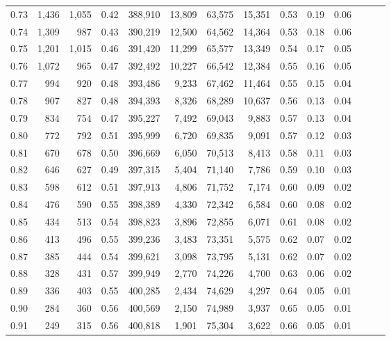 \begin{tabular}{rrrrrrrrrrrrrr}
0.73 &  1,436 &  1,055 &  0.42 &  388,910 &   13,809 &  63,575 &  15,351 &  0.53 &  0.19 &      0.06 \\
0.74 &  1,309 &    987 &  0.43 &  390,219 &   12,500 &  64,562 &  14,364 &  0.53 &  0.18 &      0.06 \\
0.75 &  1,201 &  1,015 &  0.46 &  391,420 &   11,299 &  65,577 &  13,349 &  0.54 &  0.17 &      0.05 \\
0.76 &  1,072 &    965 &  0.47 &  392,492 &   10,227 &  66,542 &  12,384 &  0.55 &  0.16 &      0.05 \\
0.77 &    994 &    920 &  0.48 &  393,486 &    9,233 &  67,462 &  11,464 &  0.55 &  0.15 &      0.04 \\
0.78 &    907 &    827 &  0.48 &  394,393 &    8,326 &  68,289 &  10,637 &  0.56 &  0.13 &      0.04 \\
0.79 &    834 &    754 &  0.47 &  395,227 &    7,492 &  69,043 &   9,883 &  0.57 &  0.13 &      0.04 \\
0.80 &    772 &    792 &  0.51 &  395,999 &    6,720 &  69,835 &   9,091 &  0.57 &  0.12 &      0.03 \\
0.81 &    670 &    678 &  0.50 &  396,669 &    6,050 &  70,513 &   8,413 &  0.58 &  0.11 &      0.03 \\
0.82 &    646 &    627 &  0.49 &  397,315 &    5,404 &  71,140 &   7,786 &  0.59 &  0.10 &      0.03 \\
0.83 &    598 &    612 &  0.51 &  397,913 &    4,806 &  71,752 &   7,174 &  0.60 &  0.09 &      0.02 \\
0.84 &    476 &    590 &  0.55 &  398,389 &    4,330 &  72,342 &   6,584 &  0.60 &  0.08 &      0.02 \\
0.85 &    434 &    513 &  0.54 &  398,823 &    3,896 &  72,855 &   6,071 &  0.61 &  0.08 &      0.02 \\
0.86 &    413 &    496 &  0.55 &  399,236 &    3,483 &  73,351 &   5,575 &  0.62 &  0.07 &      0.02 \\
0.87 &    385 &    444 &  0.54 &  399,621 &    3,098 &  73,795 &   5,131 &  0.62 &  0.07 &      0.02 \\
0.88 &    328 &    431 &  0.57 &  399,949 &    2,770 &  74,226 &   4,700 &  0.63 &  0.06 &      0.02 \\
0.89 &    336 &    403 &  0.55 &  400,285 &    2,434 &  74,629 &   4,297 &  0.64 &  0.05 &      0.01 \\
0.90 &    284 &    360 &  0.56 &  400,569 &    2,150 &  74,989 &   3,937 &  0.65 &  0.05 &      0.01 \\
0.91 &    249 &    315 &  0.56 &  400,818 &    1,901 &  75,304 &   3,622 &  0.66 &  0.05 &      0.01 \\

\end{tabular}
